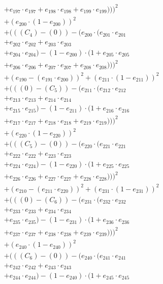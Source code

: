 \documentclass[10pt, a4paper]{article}
\begin{document}
\begin{align*}
& + e_{197} \cdot e_{197} + e_{198} \cdot e_{198} + e_{199} \cdot e_{199})))^{2} \\
& + (e_{200} \cdot (1 - e_{200}))^{2} \\
& + (((C_{4}) - (0)) - (e_{200} \cdot (e_{201} \cdot e_{201} \\
& + e_{202} \cdot e_{202} + e_{203} \cdot e_{203} \\
& + e_{204} \cdot e_{204}) - (1 - e_{200}) \cdot (1 + e_{205} \cdot e_{205} \\
& + e_{206} \cdot e_{206} + e_{207} \cdot e_{207} + e_{208} \cdot e_{208})))^{2} \\
& + (e_{190} - (e_{191} \cdot e_{200}))^{2} + (e_{211} \cdot (1 - e_{211}))^{2} \\
& + (((0) - (C_{5})) - (e_{211} \cdot (e_{212} \cdot e_{212} \\
& + e_{213} \cdot e_{213} + e_{214} \cdot e_{214} \\
& + e_{215} \cdot e_{215}) - (1 - e_{211}) \cdot (1 + e_{216} \cdot e_{216} \\
& + e_{217} \cdot e_{217} + e_{218} \cdot e_{218} + e_{219} \cdot e_{219})))^{2} \\
& + (e_{220} \cdot (1 - e_{220}))^{2} \\
& + (((C_{5}) - (0)) - (e_{220} \cdot (e_{221} \cdot e_{221} \\
& + e_{222} \cdot e_{222} + e_{223} \cdot e_{223} \\
& + e_{224} \cdot e_{224}) - (1 - e_{220}) \cdot (1 + e_{225} \cdot e_{225} \\
& + e_{226} \cdot e_{226} + e_{227} \cdot e_{227} + e_{228} \cdot e_{228})))^{2} \\
& + (e_{210} - (e_{211} \cdot e_{220}))^{2} + (e_{231} \cdot (1 - e_{231}))^{2} \\
& + (((0) - (C_{6})) - (e_{231} \cdot (e_{232} \cdot e_{232} \\
& + e_{233} \cdot e_{233} + e_{234} \cdot e_{234} \\
& + e_{235} \cdot e_{235}) - (1 - e_{231}) \cdot (1 + e_{236} \cdot e_{236} \\
& + e_{237} \cdot e_{237} + e_{238} \cdot e_{238} + e_{239} \cdot e_{239})))^{2} \\
& + (e_{240} \cdot (1 - e_{240}))^{2} \\
& + (((C_{6}) - (0)) - (e_{240} \cdot (e_{241} \cdot e_{241} \\
& + e_{242} \cdot e_{242} + e_{243} \cdot e_{243} \\
& + e_{244} \cdot e_{244}) - (1 - e_{240}) \cdot (1 + e_{245} \cdot e_{245} \\

\end{align*}
\end{document}
